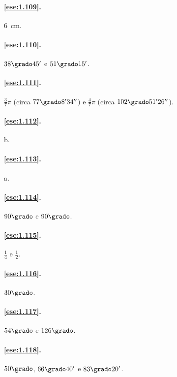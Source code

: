 \paragraph{\ref{ese:1.109}.}
6~cm.

\paragraph{\ref{ese:1.110}.}
\(38\grado 45'\) e \(51\grado 15'\).

\paragraph{\ref{ese:1.111}.}
\(\frac{3}{7}\pi\) (circa \(77\grado 8' 34''\)) e \(\frac{4}{7}\pi\) (circa 
\(102\grado 51' 26''\)).

\paragraph{\ref{ese:1.112}.}
b.

\paragraph{\ref{ese:1.113}.}
a.

\paragraph{\ref{ese:1.114}.}
\(90\grado\) e \(90\grado\).

\paragraph{\ref{ese:1.115}.}
\(\frac{1}{4}\) e \(\frac{1}{2}\).

\paragraph{\ref{ese:1.116}.}
\(30\grado\).

\paragraph{\ref{ese:1.117}.}
\(54\grado\) e \(126\grado\).

\paragraph{\ref{ese:1.118}.}
\(50\grado\), \(66\grado 40'\) e \(83\grado 20'\).

